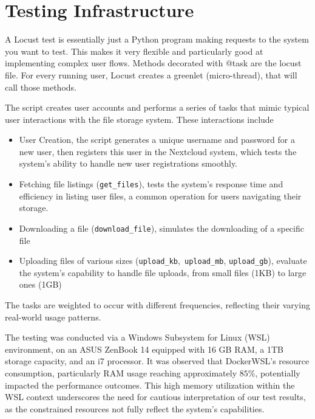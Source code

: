 \documentclass[12pt]{article}
\begin{document}

\section{Testing Infrastructure}
\label{sec:testing_infrastructure}

A Locust test is essentially just a Python program making requests to the system you want to test. This makes it very flexible and particularly good at implementing complex user flows. Methods decorated with @task are the locust file. For every running user, Locust creates a greenlet (micro-thread), that will call those methods.

The script creates user accounts and performs a series of tasks that mimic typical user interactions with the file storage system. These interactions include

\begin{itemize}
    \item User Creation, the script generates a unique username and password for a new user, then registers this user in the Nextcloud system, which tests the system's ability to handle new user registrations smoothly.
    
    \item Fetching file listings (\verb|get_files|), tests the system's response time and efficiency in listing user files, a common operation for users navigating their storage.
    
    \item Downloading a file (\verb|download_file|), simulates the downloading of a specific file 
    
    \item Uploading files of various sizes (\verb|upload_kb|,\verb| upload_mb|, \verb|upload_gb|), evaluate the system's capability to handle file uploads, from small files (1KB) to large ones (1GB)
    
\end{itemize}

The tasks are weighted to occur with different frequencies, reflecting their varying real-world usage patterns.


The testing was conducted via a Windows Subsystem for Linux (WSL) environment, on an ASUS ZenBook 14 equipped with 16 GB RAM, a 1TB storage capacity, and an i7 processor. It was observed that DockerWSL's resource consumption, particularly RAM usage reaching approximately $85\%$, potentially impacted the performance outcomes. This high memory utilization within the WSL context underscores the need for cautious interpretation of our test results, as the constrained resources not fully reflect the system's capabilities.
\end{document}
